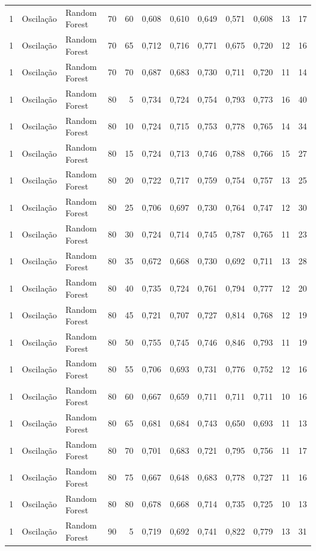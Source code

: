 \begin{longtable}{@{}rllrrrrrrrrr@{}}
1 & Oscilação & Random Forest & 70 & 60 & 0,608 & 0,610 & 0,649 & 0,571 & 0,608 & 13 & 17 \\
1 & Oscilação & Random Forest & 70 & 65 & 0,712 & 0,716 & 0,771 & 0,675 & 0,720 & 12 & 16 \\
1 & Oscilação & Random Forest & 70 & 70 & 0,687 & 0,683 & 0,730 & 0,711 & 0,720 & 11 & 14 \\
1 & Oscilação & Random Forest & 80 & 5 & 0,734 & 0,724 & 0,754 & 0,793 & 0,773 & 16 & 40 \\
1 & Oscilação & Random Forest & 80 & 10 & 0,724 & 0,715 & 0,753 & 0,778 & 0,765 & 14 & 34 \\
1 & Oscilação & Random Forest & 80 & 15 & 0,724 & 0,713 & 0,746 & 0,788 & 0,766 & 15 & 27 \\
1 & Oscilação & Random Forest & 80 & 20 & 0,722 & 0,717 & 0,759 & 0,754 & 0,757 & 13 & 25 \\
1 & Oscilação & Random Forest & 80 & 25 & 0,706 & 0,697 & 0,730 & 0,764 & 0,747 & 12 & 30 \\
1 & Oscilação & Random Forest & 80 & 30 & 0,724 & 0,714 & 0,745 & 0,787 & 0,765 & 11 & 23 \\
1 & Oscilação & Random Forest & 80 & 35 & 0,672 & 0,668 & 0,730 & 0,692 & 0,711 & 13 & 28 \\
1 & Oscilação & Random Forest & 80 & 40 & 0,735 & 0,724 & 0,761 & 0,794 & 0,777 & 12 & 20 \\
1 & Oscilação & Random Forest & 80 & 45 & 0,721 & 0,707 & 0,727 & 0,814 & 0,768 & 12 & 19 \\
1 & Oscilação & Random Forest & 80 & 50 & 0,755 & 0,745 & 0,746 & 0,846 & 0,793 & 11 & 19 \\
1 & Oscilação & Random Forest & 80 & 55 & 0,706 & 0,693 & 0,731 & 0,776 & 0,752 & 12 & 16 \\
1 & Oscilação & Random Forest & 80 & 60 & 0,667 & 0,659 & 0,711 & 0,711 & 0,711 & 10 & 16 \\
1 & Oscilação & Random Forest & 80 & 65 & 0,681 & 0,684 & 0,743 & 0,650 & 0,693 & 11 & 13 \\
1 & Oscilação & Random Forest & 80 & 70 & 0,701 & 0,683 & 0,721 & 0,795 & 0,756 & 11 & 17 \\
1 & Oscilação & Random Forest & 80 & 75 & 0,667 & 0,648 & 0,683 & 0,778 & 0,727 & 11 & 16 \\
1 & Oscilação & Random Forest & 80 & 80 & 0,678 & 0,668 & 0,714 & 0,735 & 0,725 & 10 & 13 \\
1 & Oscilação & Random Forest & 90 & 5 & 0,719 & 0,692 & 0,741 & 0,822 & 0,779 & 13 & 31 \\

\end{longtable}
